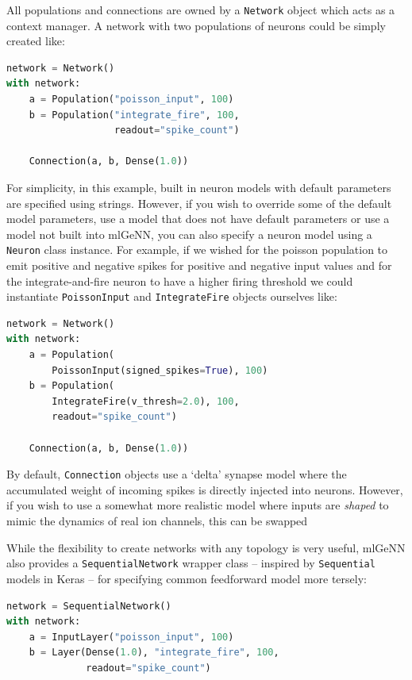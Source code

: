 \documentclass[sigconf]{acmart}
\begin{document}
All populations and connections are owned by a \lstinline{Network} object which acts as a context manager.
A network with two populations of neurons could be simply created like:

\begin{lstlisting}[language=Python]
network = Network()
with network:
    a = Population("poisson_input", 100)
    b = Population("integrate_fire", 100,
                   readout="spike_count")

    Connection(a, b, Dense(1.0))
\end{lstlisting}

For simplicity, in this example, built in neuron models with default parameters are specified using strings.
However, if you wish to override some of the default model parameters, use a model that does not have default parameters or use a model not built into mlGeNN, you can also specify a neuron model using a \lstinline{Neuron} class instance.
For example, if we wished for the poisson population to emit positive and negative spikes for positive and negative input values and for the integrate-and-fire 
neuron to have a higher firing threshold we could instantiate \lstinline{PoissonInput} and \lstinline{IntegrateFire} objects ourselves like:

\begin{lstlisting}[language=Python]
network = Network()
with network:
    a = Population(
        PoissonInput(signed_spikes=True), 100)
    b = Population(
        IntegrateFire(v_thresh=2.0), 100,
        readout="spike_count")

    Connection(a, b, Dense(1.0))
\end{lstlisting}

By default, \lstinline{Connection} objects use a `delta' synapse model where the accumulated weight of incoming spikes is directly injected into neurons. 
However, if you wish to use a somewhat more realistic model where inputs are \emph{shaped} to mimic the dynamics of real ion channels, this can be swapped

While the flexibility to create networks with any topology is very useful, mlGeNN also provides a \lstinline{SequentialNetwork} wrapper class -- inspired by \lstinline{Sequential} models in Keras -- for specifying common feedforward model more tersely:

\begin{lstlisting}[language=Python]
network = SequentialNetwork()
with network:
    a = InputLayer("poisson_input", 100)
    b = Layer(Dense(1.0), "integrate_fire", 100,
              readout="spike_count")
\end{lstlisting}
\end{document}
